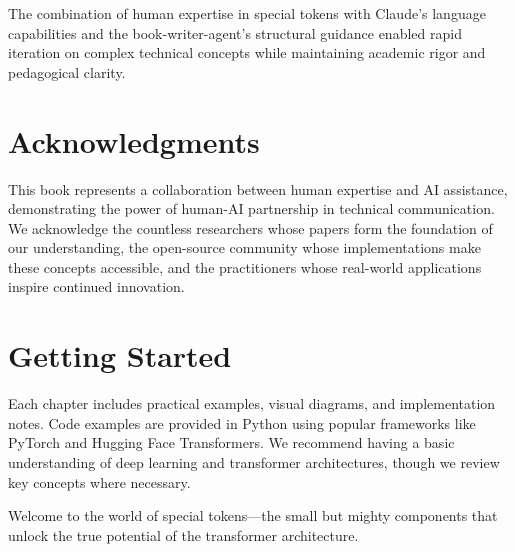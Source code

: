 The combination of human expertise in special tokens with Claude's language capabilities and the book-writer-agent's structural guidance enabled rapid iteration on complex technical concepts while maintaining academic rigor and pedagogical clarity.

\section*{Acknowledgments}

This book represents a collaboration between human expertise and AI assistance, demonstrating the power of human-AI partnership in technical communication. We acknowledge the countless researchers whose papers form the foundation of our understanding, the open-source community whose implementations make these concepts accessible, and the practitioners whose real-world applications inspire continued innovation.

\section*{Getting Started}

Each chapter includes practical examples, visual diagrams, and implementation notes. Code examples are provided in Python using popular frameworks like PyTorch and Hugging Face Transformers. We recommend having a basic understanding of deep learning and transformer architectures, though we review key concepts where necessary.

Welcome to the world of special tokens—the small but mighty components that unlock the true potential of the transformer architecture.
